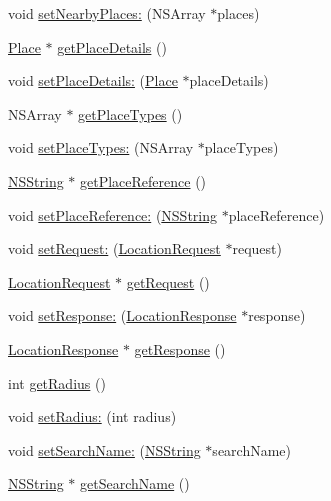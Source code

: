 \begin{DoxyCompactItemize}
void \hyperlink{interface_location_context_afdb96c229e1c3bf7702a9f31602c6261}{set\-Nearby\-Places\-:} (\-N\-S\-Array $\ast$places)
\item 
\hyperlink{interface_place}{\-Place} $\ast$ \hyperlink{interface_location_context_a5f22efdc21c51fa5dcc4c98fbd3fb883}{get\-Place\-Details} ()
\item 
void \hyperlink{interface_location_context_afd2b7fc1ba46b0485cecfcc43b3e4729}{set\-Place\-Details\-:} (\hyperlink{interface_place}{\-Place} $\ast$place\-Details)
\item 
\-N\-S\-Array $\ast$ \hyperlink{interface_location_context_a5a269f2f04867ef5fec1df57bceaac84}{get\-Place\-Types} ()
\item 
void \hyperlink{interface_location_context_a675a298663caea4a803557eb3422c7db}{set\-Place\-Types\-:} (\-N\-S\-Array $\ast$place\-Types)
\item 
\hyperlink{class_n_s_string}{\-N\-S\-String} $\ast$ \hyperlink{interface_location_context_a73af3714a342eb9735b61e260ad863c0}{get\-Place\-Reference} ()
\item 
void \hyperlink{interface_location_context_aa67689e3e0347de7b85b981eff2881c4}{set\-Place\-Reference\-:} (\hyperlink{class_n_s_string}{\-N\-S\-String} $\ast$place\-Reference)
\item 
void \hyperlink{interface_location_context_ab5a769b585be87e139d43217e84b7420}{set\-Request\-:} (\hyperlink{interface_location_request}{\-Location\-Request} $\ast$request)
\item 
\hyperlink{interface_location_request}{\-Location\-Request} $\ast$ \hyperlink{interface_location_context_af712d940aa850e84265c21bed3c45b2c}{get\-Request} ()
\item 
void \hyperlink{interface_location_context_a037ae44df4082eeb0b4236006c599f50}{set\-Response\-:} (\hyperlink{interface_location_response}{\-Location\-Response} $\ast$response)
\item 
\hyperlink{interface_location_response}{\-Location\-Response} $\ast$ \hyperlink{interface_location_context_a95d5bbf759ad443a929382c47e91ed27}{get\-Response} ()
\item 
int \hyperlink{interface_location_context_a88b1c04e5982eb5e678305130b3059ed}{get\-Radius} ()
\item 
void \hyperlink{interface_location_context_a99b9402e9d734b76e4c10466deea24b5}{set\-Radius\-:} (int radius)
\item 
void \hyperlink{interface_location_context_aae4d2ef6c38c06217a989262c4544c0f}{set\-Search\-Name\-:} (\hyperlink{class_n_s_string}{\-N\-S\-String} $\ast$search\-Name)
\item 
\hyperlink{class_n_s_string}{\-N\-S\-String} $\ast$ \hyperlink{interface_location_context_ae9a58e3182279173534a5c098f780466}{get\-Search\-Name} ()
\end{DoxyCompactItemize}
